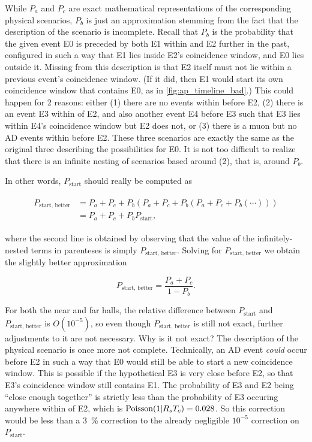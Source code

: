 While $P_a$ and $P_c$ are exact mathematical representations
of the corresponding physical scenarios,
$P_b$ is just an approximation stemming from the fact that
the description of the scenario is incomplete.
Recall that $P_b$ is the probability that the given event E0
is preceded by both E1 within \tc{} and E2 further in the past,
configured in such a way that E1 lies inside E2's coincidence window,
and E0 lies outside it.
Missing from this description is that E2 itself must not lie
within a previous event's coincidence window.
(If it did, then E1 would start its own coincidence window
that contains E0, as in \cref{fig:ap_timeline_bad}.)
This could happen for 2 reasons: either (1) there are no events
within \tc{} before E2, (2) there is an event E3 within \tc{}
of E2, and also another event E4 before E3 such that
E3 lies within E4's coincidence window but E2 does not,
or (3) there is a muon but no AD events within \tc{} before E2.
These three scenarios are exactly the same as the original three
describing the possibilities for E0.
It is not too difficult to realize that there is an infinite nesting
of scenarios based around (2), that is, around $P_b$.

In other words, $P_{\text{start}}$ should really be computed as

\begin{align*}
    \begin{split}
        P_{\text{start, better}} &= P_a + P_c + P_b(P_a +
            P_c + P_b(P_a+P_c+P_b(\cdots))) \\
                                 &= P_a + P_c + P_bP_{\text{start}},
    \end{split}
\end{align*}

where the second line is obtained by observing that the value
of the infinitely-nested terms in parenteses is simply $P_{\text{start, better}}$.
Solving for $P_{\text{start, better}}$ we obtain the slightly better approximation

\begin{equation}
    P_{\text{start, better}} = \frac{P_a + P_c}{1-P_b}.
\end{equation}

For both the near and far halls, the relative difference
between $P_{\text{start}}$ and $P_{\text{start, better}}$ is $O(10^{-5})$,
so even though $P_{\text{start, better}}$ is still not exact,
further adjustments to it are not necessary.
Why is it not exact?
The description of the physical scenario is once more not complete.
Technically, an AD event \textit{could} occur before E2 in such a way
that E0 would still be able to start a new coincidence window.
This is possible if the hypothetical E3 is very close before E2,
so that E3's coincidence window still contains E1.
The probability of E3 and E2 being ``close enough together''
is strictly less than the probability of E3 occuring anywhere
within \tc{} of E2, which is $\text{Poisson}(1\vert R_sT_c) = 0.028$.
So this correction would be less than a \SI{3}{\percent} correction
to the already negligible $10^{-5}$ correction on $P_{\text{start}}$.

